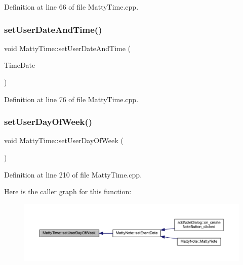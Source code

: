 Definition at line 66 of file Matty\+Time.\+cpp.

\hypertarget{classMattyTime_ae470fb0341c517348ec3ea7d606f67c5}{}\label{classMattyTime_ae470fb0341c517348ec3ea7d606f67c5} 
\subsubsection{\texorpdfstring{set\+User\+Date\+And\+Time()}{setUserDateAndTime()}\hspace{0.1cm}{\footnotesize\ttfamily [5/5]}}
{\footnotesize\ttfamily void Matty\+Time\+::set\+User\+Date\+And\+Time (\begin{DoxyParamCaption}\item[{\hyperlink{structTimeAndDate}{Time\+And\+Date}}]{Time\+Date }\end{DoxyParamCaption})}



Definition at line 76 of file Matty\+Time.\+cpp.

\hypertarget{classMattyTime_a12b0e0b9c4d45248da89e2d4078d4d08}{}\label{classMattyTime_a12b0e0b9c4d45248da89e2d4078d4d08} 
\subsubsection{\texorpdfstring{set\+User\+Day\+Of\+Week()}{setUserDayOfWeek()}}
{\footnotesize\ttfamily void Matty\+Time\+::set\+User\+Day\+Of\+Week (\begin{DoxyParamCaption}{ }\end{DoxyParamCaption})}



Definition at line 210 of file Matty\+Time.\+cpp.

Here is the caller graph for this function\+:
\nopagebreak
\begin{figure}[H]
\begin{center}
\leavevmode
\includegraphics[width=350pt]{classMattyTime_a12b0e0b9c4d45248da89e2d4078d4d08_icgraph}
\end{center}
\end{figure}
\hypertarget{classMattyTime_afef585f71d11eed7777065af8ca0e9f0}{}\label{classMattyTime_afef585f71d11eed7777065af8ca0e9f0} 
